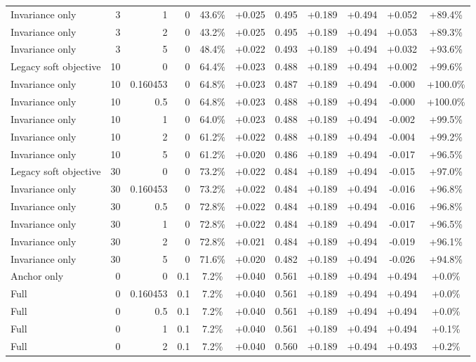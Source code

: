 \begin{table}[htbp]
\begin{tabular}{lrrrccccccc}
Invariance only & 3 & 1 & 0 & 43.6\% & +0.025 & 0.495 & +0.189 & +0.494 & +0.052 & +89.4\% \\
Invariance only & 3 & 2 & 0 & 43.2\% & +0.025 & 0.495 & +0.189 & +0.494 & +0.053 & +89.3\% \\
Invariance only & 3 & 5 & 0 & 48.4\% & +0.022 & 0.493 & +0.189 & +0.494 & +0.032 & +93.6\% \\
Legacy soft objective & 10 & 0 & 0 & 64.4\% & +0.023 & 0.488 & +0.189 & +0.494 & +0.002 & +99.6\% \\
Invariance only & 10 & 0.160453 & 0 & 64.8\% & +0.023 & 0.487 & +0.189 & +0.494 & -0.000 & +100.0\% \\
Invariance only & 10 & 0.5 & 0 & 64.8\% & +0.023 & 0.488 & +0.189 & +0.494 & -0.000 & +100.0\% \\
Invariance only & 10 & 1 & 0 & 64.0\% & +0.023 & 0.488 & +0.189 & +0.494 & -0.002 & +99.5\% \\
Invariance only & 10 & 2 & 0 & 61.2\% & +0.022 & 0.488 & +0.189 & +0.494 & -0.004 & +99.2\% \\
Invariance only & 10 & 5 & 0 & 61.2\% & +0.020 & 0.486 & +0.189 & +0.494 & -0.017 & +96.5\% \\
Legacy soft objective & 30 & 0 & 0 & 73.2\% & +0.022 & 0.484 & +0.189 & +0.494 & -0.015 & +97.0\% \\
Invariance only & 30 & 0.160453 & 0 & 73.2\% & +0.022 & 0.484 & +0.189 & +0.494 & -0.016 & +96.8\% \\
Invariance only & 30 & 0.5 & 0 & 72.8\% & +0.022 & 0.484 & +0.189 & +0.494 & -0.016 & +96.8\% \\
Invariance only & 30 & 1 & 0 & 72.8\% & +0.022 & 0.484 & +0.189 & +0.494 & -0.017 & +96.5\% \\
Invariance only & 30 & 2 & 0 & 72.8\% & +0.021 & 0.484 & +0.189 & +0.494 & -0.019 & +96.1\% \\
Invariance only & 30 & 5 & 0 & 71.6\% & +0.020 & 0.482 & +0.189 & +0.494 & -0.026 & +94.8\% \\
Anchor only & 0 & 0 & 0.1 & 7.2\% & +0.040 & 0.561 & +0.189 & +0.494 & +0.494 & +0.0\% \\
Full & 0 & 0.160453 & 0.1 & 7.2\% & +0.040 & 0.561 & +0.189 & +0.494 & +0.494 & +0.0\% \\
Full & 0 & 0.5 & 0.1 & 7.2\% & +0.040 & 0.561 & +0.189 & +0.494 & +0.494 & +0.0\% \\
Full & 0 & 1 & 0.1 & 7.2\% & +0.040 & 0.561 & +0.189 & +0.494 & +0.494 & +0.1\% \\
Full & 0 & 2 & 0.1 & 7.2\% & +0.040 & 0.560 & +0.189 & +0.494 & +0.493 & +0.2\% \\

\end{tabular}
\end{table}
